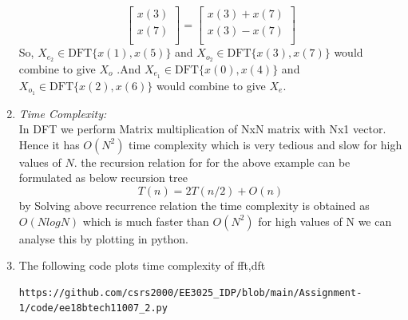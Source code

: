 \documentclass[journal,12pt,twocolumn]{IEEEtran}
\renewcommand\thesection{\arabic{section}}
\begin{document}
\begin{enumerate}[label=\thesection.\arabic*.,ref=\thesection.\theenumi]
\begin{equation}
\begin{bmatrix}
x(3) \\ 
x(7) \\ 
\end{bmatrix}
=
\begin{bmatrix}
x(3)+x(7) \\ 
x(3)-x(7) \\ 
\end{bmatrix}
\end{equation}
So, $X_{e_{2}} \in \text{DFT} \{x(1),x(5)\}$ and $X_{o_{2}} \in \text{DFT} \{x(3),x(7)\}$ would combine to give $X_{o}$ .And $X_{e_{1}} \in \text{DFT} \{x(0),x(4)\}$ and $X_{o_{1}} \in \text{DFT} \{x(2),x(6)\}$ would combine to give $X_{e}$.
\item \emph{Time Complexity:} \\
In DFT we perform  Matrix multiplication of NxN matrix with Nx1 vector.
Hence it has $O(N^2)$ time complexity which is very tedious and slow for high values of  $N$.
\newline
the recursion relation for for the above example can be formulated as below recursion tree
\begin{equation}
    T(n) = 2T(n/2) + O(n)
\end{equation}
by Solving above recurrence relation the time complexity is obtained as $O(NlogN)$ which is much faster than $O(N^2)$ for high values of N we can analyse this by plotting in python.

\item The following code plots time complexity of fft,dft
\begin{lstlisting}
https://github.com/csrs2000/EE3025_IDP/blob/main/Assignment-1/code/ee18btech11007_2.py
\end{lstlisting}


\end{enumerate}
\end{document}
